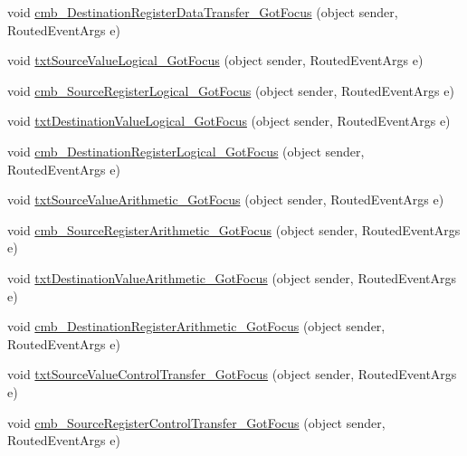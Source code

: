 \begin{DoxyCompactItemize}
\item 
void \hyperlink{class_c_p_u___o_s___simulator_1_1_instructions_window_a94becba2935eb5b5213fce4a90a639e2}{cmb\+\_\+\+Destination\+Register\+Data\+Transfer\+\_\+\+Got\+Focus} (object sender, Routed\+Event\+Args e)
\item 
void \hyperlink{class_c_p_u___o_s___simulator_1_1_instructions_window_a1126bf0eb7a7e562d7c197a7300842d2}{txt\+Source\+Value\+Logical\+\_\+\+Got\+Focus} (object sender, Routed\+Event\+Args e)
\item 
void \hyperlink{class_c_p_u___o_s___simulator_1_1_instructions_window_abe93d8b72aefc8adcf3b5bb26cc55a1b}{cmb\+\_\+\+Source\+Register\+Logical\+\_\+\+Got\+Focus} (object sender, Routed\+Event\+Args e)
\item 
void \hyperlink{class_c_p_u___o_s___simulator_1_1_instructions_window_ad56b9592b566db4c4e4756654891a045}{txt\+Destination\+Value\+Logical\+\_\+\+Got\+Focus} (object sender, Routed\+Event\+Args e)
\item 
void \hyperlink{class_c_p_u___o_s___simulator_1_1_instructions_window_a596ecf3b64608b39235b662565469b3e}{cmb\+\_\+\+Destination\+Register\+Logical\+\_\+\+Got\+Focus} (object sender, Routed\+Event\+Args e)
\item 
void \hyperlink{class_c_p_u___o_s___simulator_1_1_instructions_window_a82c5caec3787f079bb214dbd6a2a1505}{txt\+Source\+Value\+Arithmetic\+\_\+\+Got\+Focus} (object sender, Routed\+Event\+Args e)
\item 
void \hyperlink{class_c_p_u___o_s___simulator_1_1_instructions_window_aded465dc161799c6ae52c988e3f8882c}{cmb\+\_\+\+Source\+Register\+Arithmetic\+\_\+\+Got\+Focus} (object sender, Routed\+Event\+Args e)
\item 
void \hyperlink{class_c_p_u___o_s___simulator_1_1_instructions_window_ae969ae41ccdb44d87f180b18b11b5b29}{txt\+Destination\+Value\+Arithmetic\+\_\+\+Got\+Focus} (object sender, Routed\+Event\+Args e)
\item 
void \hyperlink{class_c_p_u___o_s___simulator_1_1_instructions_window_a9c964d2e398c2ed0699652c67c80422a}{cmb\+\_\+\+Destination\+Register\+Arithmetic\+\_\+\+Got\+Focus} (object sender, Routed\+Event\+Args e)
\item 
void \hyperlink{class_c_p_u___o_s___simulator_1_1_instructions_window_a0d1f28315429ad5e01867bef7dbf9b6b}{txt\+Source\+Value\+Control\+Transfer\+\_\+\+Got\+Focus} (object sender, Routed\+Event\+Args e)
\item 
void \hyperlink{class_c_p_u___o_s___simulator_1_1_instructions_window_a035689dfb95c248b0cadb714a326b714}{cmb\+\_\+\+Source\+Register\+Control\+Transfer\+\_\+\+Got\+Focus} (object sender, Routed\+Event\+Args e)

\end{DoxyCompactItemize}
